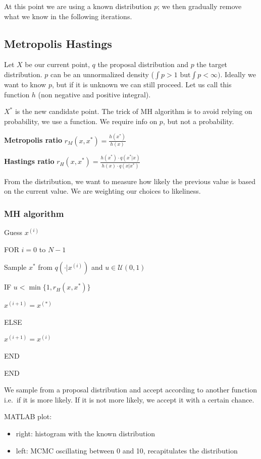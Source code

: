 At this point we are using a known distribution $p$; we then gradually
remove what we know in the following iterations.

\hypertarget{metropolis-hastings}{%
\subsection{Metropolis Hastings}\label{metropolis-hastings}}

Let $X$ be our current point, $q$ the proposal distribution and $p$ the
target distribution. $p$ can be an unnormalized density
($\int p > 1 \text{ but} \int p < \infty)$. Ideally we want to know $p$,
but if it is unknown we can still proceed. Let us call this function $h$
(non negative and positive integral).

$X^*$ is the new candidate point. The trick of MH algorithm is to avoid
relying on probability, we use a function. We require info on $p$, but
not a probability.

\textbf{Metropolis ratio} $r_M(x,x^*)=\frac{h(x^*)}{h(x)}$

\textbf{Hastings ratio}
$r_H(x,x^*)=\frac{h(x^*)\cdot q(x^*|x)}{h(x)\cdot q(x|x^*)}$

From the distribution, we want to measure how likely the previous value
is based on the current value. We are weighting our choices to
likeliness.

\hypertarget{mh-algorithm}{%
\subsubsection{MH algorithm}\label{mh-algorithm}}

Guess $x^{(i)}$

FOR $i=0$ to $N-1$

Sample $x^*$ from $q(\cdot|x^{(i)})$ and $u \in \mathcal{U}(0,1)$

IF $u < \min \{1, r_H(x,x^*) \}$

$x^{(i+1)}=x^{(*)}$

ELSE

$x^{(i+1)}=x^{(i)}$

END

END

We sample from a proposal distribution and accept according to another
function i.e.~if it is more likely. If it is not more likely, we accept
it with a certain chance.

MATLAB plot:

\begin{itemize}
\tightlist
\item
  right: histogram with the known distribution
\item
  left: MCMC oscillating between 0 and 10, recapitulates the
  distribution
\end{itemize}

